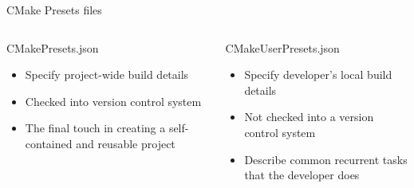 \documentclass{beamer}
\begin{document}
\begin{frame}[fragile]{CMake Presets files}\small%
	\vspace{1cm}
			\begin{columns}
				\begin{block}{CMakePresets.json}
					\begin{itemize}\footnotesize
						\item Specify project-wide build details
						\item Checked into version control system
						\item The final touch in creating a self-contained and reusable project
 					\end{itemize}
				\end{block}
				\begin{block}{CMakeUserPresets.json}\footnotesize
					\begin{itemize}
						\item Specify developer's local build details
						\item Not checked into a version control system
						\item Describe common recurrent tasks that the developer does
					\end{itemize}
				\end{block}
			\end{columns}
\end{frame}
\end{document}
